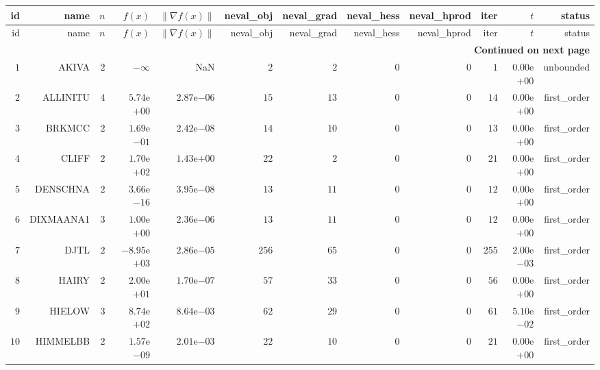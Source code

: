 \begin{longtable}{rrrrrrrrrrrr}
  \hline
  id & name & \(n\) & \(f(x)\) & \(\|\nabla f(x)\|\) & neval\_obj & neval\_grad & neval\_hess & neval\_hprod & iter & \(t\) & status \\\hline
  \endfirsthead
  \hline
  id & name & \(n\) & \(f(x)\) & \(\|\nabla f(x)\|\) & neval\_obj & neval\_grad & neval\_hess & neval\_hprod & iter & \(t\) & status \\\hline
  \endhead
  \hline
  \multicolumn{12}{r}{{\bfseries Continued on next page}}\\
  \hline
  \endfoot
  \endlastfoot
  \(     1\) & AKIVA & \(     2\) & \(-\infty\) &       NaN & \(     2\) & \(     2\) & \(     0\) & \(     0\) & \(     1\) & \( 0.00\)e\(+00\) & unbounded \\
  \(     2\) & ALLINITU & \(     4\) & \( 5.74\)e\(+00\) & \( 2.87\)e\(-06\) & \(    15\) & \(    13\) & \(     0\) & \(     0\) & \(    14\) & \( 0.00\)e\(+00\) & first\_order \\
  \(     3\) & BRKMCC & \(     2\) & \( 1.69\)e\(-01\) & \( 2.42\)e\(-08\) & \(    14\) & \(    10\) & \(     0\) & \(     0\) & \(    13\) & \( 0.00\)e\(+00\) & first\_order \\
  \(     4\) & CLIFF & \(     2\) & \( 1.70\)e\(+02\) & \( 1.43\)e\(+00\) & \(    22\) & \(     2\) & \(     0\) & \(     0\) & \(    21\) & \( 0.00\)e\(+00\) & first\_order \\
  \(     5\) & DENSCHNA & \(     2\) & \( 3.66\)e\(-16\) & \( 3.95\)e\(-08\) & \(    13\) & \(    11\) & \(     0\) & \(     0\) & \(    12\) & \( 0.00\)e\(+00\) & first\_order \\
  \(     6\) & DIXMAANA1 & \(     3\) & \( 1.00\)e\(+00\) & \( 2.36\)e\(-06\) & \(    13\) & \(    11\) & \(     0\) & \(     0\) & \(    12\) & \( 0.00\)e\(+00\) & first\_order \\
  \(     7\) & DJTL & \(     2\) & \(-8.95\)e\(+03\) & \( 2.86\)e\(-05\) & \(   256\) & \(    65\) & \(     0\) & \(     0\) & \(   255\) & \( 2.00\)e\(-03\) & first\_order \\
  \(     8\) & HAIRY & \(     2\) & \( 2.00\)e\(+01\) & \( 1.70\)e\(-07\) & \(    57\) & \(    33\) & \(     0\) & \(     0\) & \(    56\) & \( 0.00\)e\(+00\) & first\_order \\
  \(     9\) & HIELOW & \(     3\) & \( 8.74\)e\(+02\) & \( 8.64\)e\(-03\) & \(    62\) & \(    29\) & \(     0\) & \(     0\) & \(    61\) & \( 5.10\)e\(-02\) & first\_order \\
  \(    10\) & HIMMELBB & \(     2\) & \( 1.57\)e\(-09\) & \( 2.01\)e\(-03\) & \(    22\) & \(    10\) & \(     0\) & \(     0\) & \(    21\) & \( 0.00\)e\(+00\) & first\_order \\

\end{longtable}
